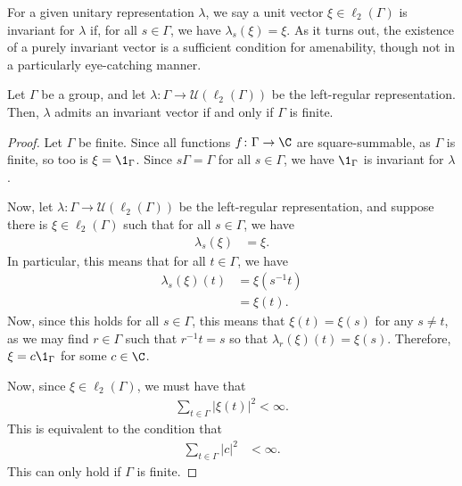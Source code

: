 For a given unitary representation $\lambda$, we say a unit vector $\xi\in\ell_2\left( \Gamma \right)$ is invariant for $\lambda$ if, for all $s\in\Gamma$, we have $\lambda_s\left( \xi \right) = \xi$. As it turns out, the existence of a purely invariant vector is a sufficient condition for amenability, though not in a particularly eye-catching manner.

\begin{theorem}
  Let $\Gamma$ be a group, and let $\lambda\colon \Gamma\rightarrow \mathcal{U}\left( \ell_2\left( \Gamma \right) \right)$ be the left-regular representation. Then, $\lambda$ admits an invariant vector if and only if $\Gamma$ is finite.
\end{theorem}
\begin{proof}
  Let $\Gamma$ be finite. Since all functions $f\colon \Gamma\rightarrow \C$ are square-summable, as $\Gamma$ is finite, so too is $\xi = \1_{\Gamma}$. Since $s\Gamma = \Gamma$ for all $s\in\Gamma$, we have $\1_{\Gamma}$ is invariant for $\lambda$.\newline

  Now, let $\lambda\colon \Gamma\rightarrow \mathcal{U}\left( \ell_2\left( \Gamma \right) \right)$ be the left-regular representation, and suppose there is $\xi\in \ell_2\left( \Gamma \right)$ such that for all $s\in\Gamma$, we have
  \begin{align*}
    \lambda_s\left( \xi \right) &= \xi.
  \end{align*}
  In particular, this means that for all $t\in\Gamma$, we have
  \begin{align*}
    \lambda_s\left( \xi \right)\left( t \right) &= \xi\left( s^{-1}t \right)\\
                                                &= \xi\left( t \right).
  \end{align*}
  Now, since this holds for all $s\in\Gamma$, this means that $\xi\left( t \right) = \xi\left( s \right)$ for any $s\neq t$, as we may find $r\in \Gamma$ such that $r^{-1}t = s$ so that $\lambda_r\left( \xi \right)\left( t \right) = \xi\left( s \right)$. Therefore, $\xi = c\1_{\Gamma}$ for some $c\in\C$.\newline

  Now, since $\xi\in \ell_2\left( \Gamma \right)$, we must have that
  \begin{align*}
    \sum_{t\in\Gamma}\left\vert \xi(t) \right\vert^2 < \infty.
  \end{align*}
  This is equivalent to the condition that
  \begin{align*}
    \sum_{t\in\Gamma}\left\vert c \right\vert^2 &< \infty.
  \end{align*}
  This can only hold if $\Gamma$ is finite.
\end{proof}
